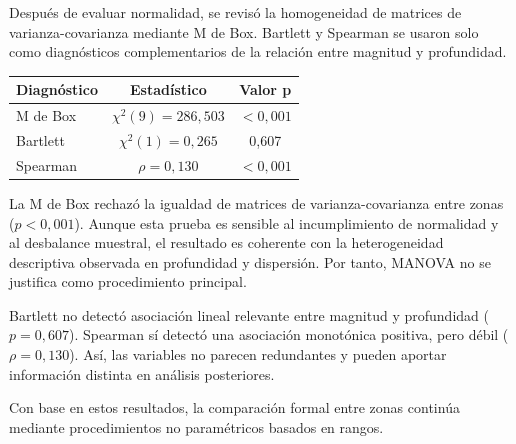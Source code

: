 \documentclass[
  spanish,
  letterpaper,
  DIV=11,
  numbers=noendperiod]{scrartcl}
\begin{document}
\noindent
\begin{minipage}[t]{0.45\textwidth}
\vspace{0pt}
Después de evaluar normalidad, se revisó la homogeneidad de matrices de varianza-covarianza mediante M de Box. Bartlett y Spearman se usaron solo como diagnósticos complementarios de la relación entre magnitud y profundidad.
\end{minipage}\hfill
\begin{minipage}[t]{0.51\textwidth}
\vspace{0pt}
\begingroup
\scriptsize
\centering
\setlength{\tabcolsep}{1.6pt}
\renewcommand{\arraystretch}{0.82}
{}
\label{tbl-diagnosticos-complementarios-mag-depth}
\hypertarget{dest-tbl-diagnosticos-complementarios-mag-depth}{}
\begin{tabular*}{\linewidth}{@{\extracolsep{\fill}}lcc@{}}
\toprule
Diagnóstico & Estadístico & Valor p \\
\midrule
M de Box & $\chi^2(9)=286{,}503$ & $<0{,}001$ \\
Bartlett & $\chi^2(1)=0{,}265$ & 0,607 \\
Spearman & $\rho=0{,}130$ & $<0{,}001$ \\
\bottomrule
\end{tabular*}
\par\vspace{0.10em}
\endgroup
\end{minipage}
\par\vspace{0.15em}

La M de Box rechazó la igualdad de matrices de varianza-covarianza entre
zonas (\(p<0{,}001\)). Aunque esta prueba es sensible al incumplimiento
de normalidad y al desbalance muestral, el resultado es coherente con la
heterogeneidad descriptiva observada en profundidad y dispersión. Por
tanto, MANOVA no se justifica como procedimiento principal.

Bartlett no detectó asociación lineal relevante entre magnitud y
profundidad (\(p=0{,}607\)). Spearman sí detectó una asociación
monotónica positiva, pero débil (\(\rho=0{,}130\)). Así, las variables
no parecen redundantes y pueden aportar información distinta en análisis
posteriores.

Con base en estos resultados, la comparación formal entre zonas continúa
mediante procedimientos no paramétricos basados en rangos.
\end{document}
